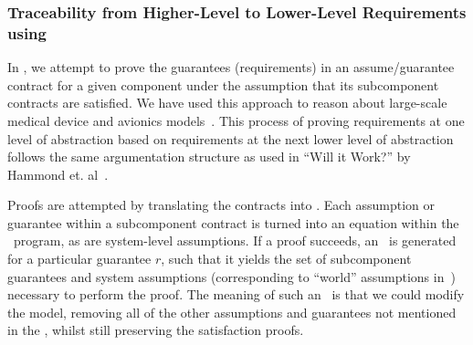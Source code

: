

\subsubsection{Traceability from Higher-Level to Lower-Level Requirements using \agree}
In \agree, we attempt to prove the guarantees (requirements) in an assume/guarantee contract for a given component under the assumption that its subcomponent contracts are satisfied.  We have used this approach to reason about large-scale medical device and avionics models~\cite{QFCS15:backes,hilt2013}.  This process of proving requirements at one level of abstraction based on requirements at the next lower level of abstraction follows the same argumentation structure as used in ``Will it Work?'' by Hammond et. al~\cite{Hammond01:WiW}.


Proofs are attempted by translating the contracts into \jkind.  Each assumption or guarantee within a subcomponent contract is turned into an equation within the \jkind\ program, as are system-level assumptions.  If a proof succeeds, an \mivc\ is generated for a particular guarantee $r$, such that it yields the set of subcomponent guarantees and system assumptions (corresponding to ``world'' assumptions in~\cite{zave1997four}) necessary to perform the proof.  The meaning of such an \mivc\ is that we could modify the model, removing all of the other assumptions and guarantees not mentioned in the \mivc, whilst still preserving the satisfaction proofs.


